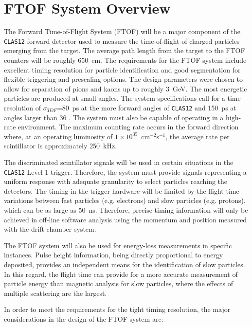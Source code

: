 \section{FTOF System Overview}

The Forward Time-of-Flight System (FTOF) will be a major component of the 
{\tt CLAS12} forward detector used to measure the time-of-flight of charged 
particles emerging from the target.  The average path length from the target 
to the FTOF counters will be roughly 650~cm.  The requirements for the FTOF 
system include excellent timing resolution for particle identification and 
good segmentation for flexible triggering and prescaling options.  The design
parameters were chosen to allow for separation of pions and kaons up to 
roughly 3~GeV.  The most energetic particles are produced at small angles.  
The system specifications call for a time resolution of $\sigma_{TOF}$=80~ps 
at the more forward angles of {\tt CLAS12} and 150~ps at angles larger than
36$^\circ$.  The system must also be capable of operating in a high-rate 
environment.  The maximum counting rate occurs in the forward direction 
where, at an operating luminosity of $1\times10^{35}$~cm$^{-2}$s$^{-1}$, the 
average rate per scintillator is approximately 250~kHz.

The discriminated scintillator signals will be used in certain situations 
in the {\tt CLAS12} Level-1 trigger.  Therefore, the system must provide 
signals representing a uniform response with adequate granularity to select 
particles reaching the detectors.  The timing in the trigger hardware will 
be limited by the flight time variations between fast particles (e.g. 
electrons) and slow particles (e.g. protons), which can be as large as 50~ns.
Therefore, precise timing information will only be achieved in off-line 
software analysis using the momentum and position measured with the drift 
chamber system.

The FTOF system will also be used for energy-loss measurements in specific 
instances.  Pulse height information, being directly proportional to energy 
deposited, provides an independent means for the identification of slow 
particles.  In this regard, the flight time can provide for a more accurate 
measurement of particle energy than magnetic analysis for slow particles, 
where the effects of multiple scattering are the largest.

In order to meet the requirements for the tight timing resolution, the major 
considerations in the design of the FTOF system are:

